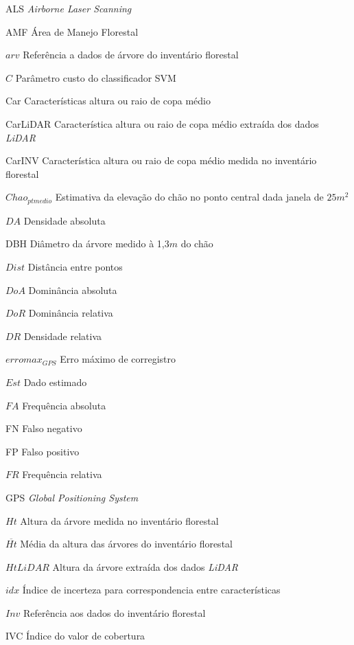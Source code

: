 \documentclass[
	12pt,				%
	openright,			%
	twoside,			%
	a4paper,			%
	chapter=TITLE,		%
	sumario=abnt-6027-2012,
	english,			%
	brazil				%
	]{UFVJM-abntex2}
\begin{document}
\begin{siglas}
\label{Siglas}
\item[ALS] \textit{Airborne Laser Scanning}
\item[AMF] Área de Manejo Florestal 
\item[$arv$] Referência a dados de árvore do inventário florestal
\item[$C$] Parâmetro custo do classificador SVM
\item[Car] Características altura ou raio de copa médio
\item[Car{LiDAR}] Característica altura ou raio de copa médio extraída dos dados \textit{LiDAR}
\item[CarINV] Característica altura ou raio de copa médio medida no inventário florestal
\item[$Chao_{ptmedio}$] Estimativa da elevação do chão no ponto central dada janela de $25 m^2$
\item[$DA$] Densidade absoluta 
\item[DBH] Diâmetro da árvore medido à 1,3$m$ do chão
\item[$Dist$] Distância entre pontos
\item[$DoA$] Dominância absoluta
\item[$DoR$] Dominância relativa
\item[$DR$] Densidade relativa
\item[$erromax_{GPS}$] Erro máximo de corregistro
\item[$Est$] Dado estimado
\item[$FA$] Frequência absoluta
\item[FN] Falso negativo
\item[FP] Falso positivo
\item[$FR$] Frequência relativa
\item[GPS] \textit{Global Positioning System}
\item[$Ht$] Altura da árvore medida no inventário florestal
\item[$\overline{Ht}$] Média da altura das árvores do inventário florestal
\item[$Ht{LiDAR}$] Altura da árvore extraída dos dados \textit{LiDAR}
\item[$idx$] Índice de incerteza para correspondencia entre características
\item[$Inv$] Referência aos dados do inventário florestal
\item[IVC] Índice do valor de cobertura

\end{siglas}
\end{document}
